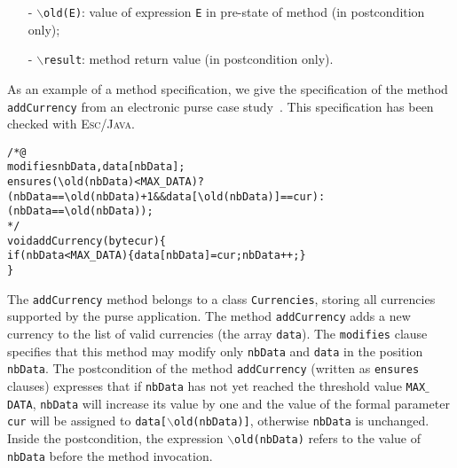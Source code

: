 \documentclass[a4paper]{llncs}
\newcommand{\escj}{\textsc{Esc/Java}}
\begin{document}
\begin{itemize}
\begin{itemize}
\item[-]{\texttt{$\backslash$old(E)}}: 
value of expression \texttt{E} in pre-state of method
(in postcondition only);
 
\item[-] {\tt$\backslash$result}: method return value (in postcondition
only).
\end{itemize} 
\end{itemize} 

As an example of a method specification, we give the
specification of the method \texttt{addCurrency} from an electronic
purse case study~\cite{CatanoH02a}. This specification has been
checked with \escj.
\begin{alltt}
/*@
  modifies nbData, data[nbData];
  ensures (\verb!\!old(nbData) < MAX_DATA) ?
      (nbData == \verb!\!old(nbData) + 1 && data[\verb!\!old(nbData)] == cur) :
      (nbData == \verb!\!old(nbData));
*/
void addCurrency(byte cur)\verb!{!
   if(nbData < MAX_DATA)\verb!{!data[nbData] = cur; nbData++;\verb!}!
\verb!}!
\end{alltt}
The \texttt{addCurrency} method belongs
to a class \texttt{Currencies}, storing all currencies 
supported by the purse application. The method 
\texttt{addCurrency} adds a new currency to the list of valid 
currencies (the array \texttt{data}). The \texttt{modifies} clause
specifies that this method may modify only \texttt{nbData} and 
\texttt{data} in the position \texttt{nbData}. The
postcondition of the method \texttt{addCurrency} (written as 
\texttt{ensures} clauses) expresses that if \texttt{nbData} has not 
yet reached the threshold value \texttt{MAX$\_$DATA}, \texttt{nbData} 
will increase its value by one and the value of the formal parameter 
\texttt{cur} will be assigned to
\texttt{data[\(\backslash\)old(nbData)]}, otherwise \texttt{nbData} is 
unchanged.  Inside the postcondition, the expression
\texttt{$\backslash$old(nbData)} refers to the value of 
\texttt{nbData} before the method invocation. 
\end{document}
